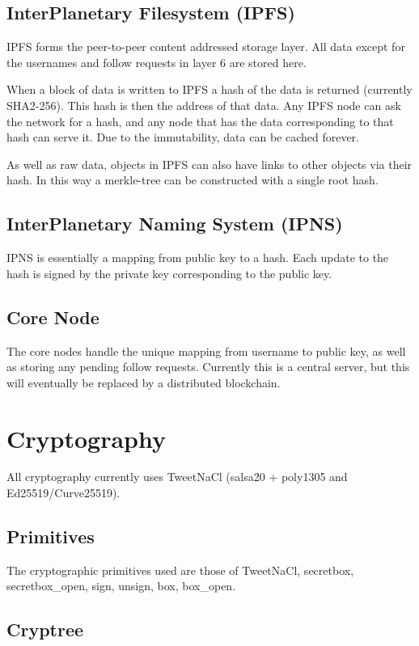 \documentclass[12pt]{article}
\begin{document}
\subsection*{InterPlanetary Filesystem (IPFS)}
IPFS forms the peer-to-peer content addressed storage layer. All data except for the usernames and follow requests in layer 6 are stored here. 

When a block of data is written to IPFS a hash of the data is returned (currently SHA2-256). This hash is then the address of that data. Any IPFS node can ask the network for a hash, and any node that has the data corresponding to that hash can serve it. Due to the immutability, data can be cached forever. 

As well as raw data, objects in IPFS can also have links to other objects via their hash. In this way a merkle-tree can be constructed with a single root hash. 

\subsection*{InterPlanetary Naming System (IPNS)}
IPNS is essentially a mapping from public key to a hash. Each update to the hash is signed by the private key corresponding to the public key. 

\subsection*{Core Node}
The core nodes handle the unique mapping from username to public key, as well as storing any pending follow requests. Currently this is a central server, but this will eventually be replaced by a distributed blockchain. 

\section*{Cryptography}
All cryptography currently uses TweetNaCl (salsa20 + poly1305 and Ed25519/Curve25519). 

\subsection*{Primitives}
The cryptographic primitives used are those of TweetNaCl, secretbox, secretbox\_open, sign, unsign, box, box\_open.

\subsection*{Cryptree}
\end{document}
